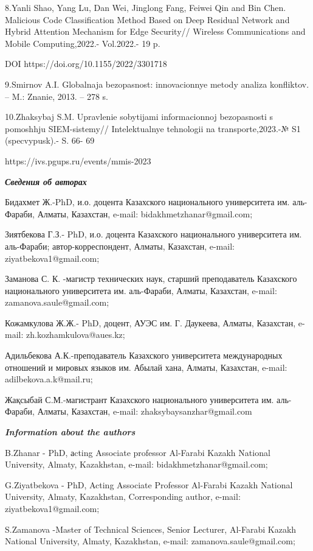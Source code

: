 8.Yanli Shao, Yang Lu, Dan Wei, Jinglong Fang, Feiwei Qin and Bin Chen.
Malicious Code Classification Method Based on Deep Residual Network and
Hybrid Attention Mechanism for Edge Security// Wireless Communications
and Mobile Computing,2022.- Vol.2022.- 19 p.

DOI https://doi.org/10.1155/2022/3301718

9.Smirnov A.I. Global\textquotesingle naja bezopasnost\textquotesingle:
innovacionnye metody analiza konfliktov. -- M.: Znanie, 2013. -- 278 s.

10.Zhaksybaj S.M. Upravlenie sobytijami informacionnoj bezopasnosti s
pomoshh\textquotesingle ju SIEM-sistemy//
Intelektual\textquotesingle nye tehnologii na transporte,2023.-№ S1
(specvypusk).- S. 66- 69

https://ivs.pgups.ru/events/mmis-2023

\emph{\textbf{Сведения об авторах}}

Бидахмет Ж.-PhD, и.о. доцента Казахского национального университета им.
аль-Фараби, Алматы, Казахстан, e-mail: bidakhmetzhanar@gmail.com;

Зиятбекова Г.З.- PhD, и.о. доцента Казахского национального университета
им. аль-Фараби; автор-корреспондент, Алматы, Казахстан, e-mail:
ziyatbekova1@gmail.com;

Заманова С. К. -магистр технических наук, старший преподаватель
Казахского национального университета им. аль-Фараби, Алматы, Казахстан,
e-mail: zamanova.saule@gmail.com;

Кожамкулова Ж.Ж.- PhD, доцент, АУЭС им. Г. Даукеева, Алматы, Казахстан,
e-mail: zh.kozhamkulova@aues.kz;

Адильбекова А.К.-преподаватель Казахского университета международных
отношений и мировых языков им. Абылай хана, Алматы, Казахстан, e-mail:
adilbekova.a.k@mail.ru;

Жақсыбай С.М.-магистрант Казахского национального университета им.
аль-Фараби, Алматы, Казахстан, e-mail: zhaksybaysanzhar@gmail.com

\emph{\textbf{Information about the authors}}

B.Zhanar - PhD, аcting Associate professor Al-Farabi Kazakh National
University, Almaty, Kazakhstan, e-mail: bidakhmetzhanar@gmail.com;

G.Ziyatbekova - PhD, Acting Associate Professor Al-Farabi Kazakh
National University, Almaty, Kazakhstan, Corresponding author, e-mail:
ziyatbekova1@gmail.com;

S.Zamanova -Master of Technical Sciences, Senior Lecturer, Al-Farabi
Kazakh National University, Almaty, Kazakhstan, e-mail:
zamanova.saule@gmail.com;

